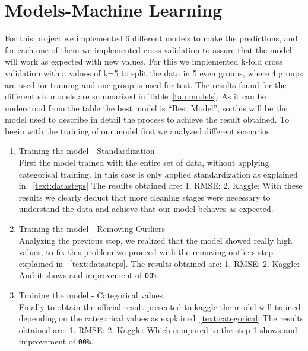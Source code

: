 \documentclass[10pt,conference,compsocconf]{IEEEtran}
\begin{document}
\section{Models-Machine Learning}
For this project we implemented 6 different models to make the predictions, 
and for each one of them we implemented cross validation to assure that the 
model will work as expected with new values. For this we implemented k-fold 
cross validation with a values of k=5 to split the data in 5 even groups, where 
4 groups are used for training and one group is used for test. 
The results found for the different six models are summarized in Table~\ref{tab:models}.
As it can be understood from the table the best model is ``Best Model'', so this will
be the model used to describe in detail the process to achieve the result obtained.
To begin with the training of our model first we analyzed different scenarios: 

\begin{enumerate}
\item Training the model - Standardization \\
First the model trained with the entire set of data, without applying categorical 
training. In this case is only applied standardization as explained in ~\ref{text:datasteps}
The results obtained are:
1. RMSE:    2. Kaggle: 
With these results we clearly deduct that more cleaning stages were necessary to understand
the data and achieve that our model behaves as expected.

\item Training the model - Removing Outliers \\
Analyzing the previous step, we realized that the model showed really high values, to fix
this problem we proceed with the removing outliers step explained in ~\ref{text:datasteps}.
The results obtained are:
1. RMSE:    2. Kaggle: 
And it shows and improvement of \texttt{00\%}
\item Training the model - Categorical values \\
 Finally to obtain the official result presented to kaggle the model will trained depending
 on the categorical values as explained~\ref{text:categorical}
 The results obtained are:
 1. RMSE:    2. Kaggle:
 Which compared to the step 1 shows and improvement of \texttt{00\%}.
\end{enumerate}
\end{document}
